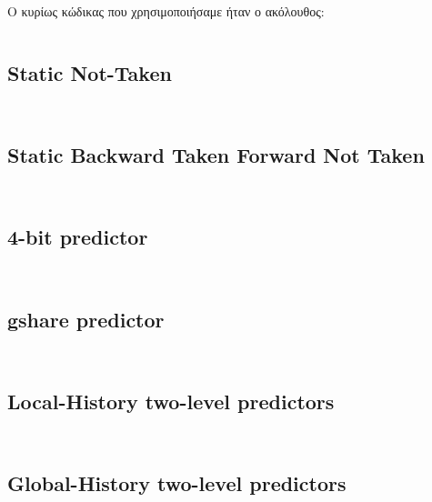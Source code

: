 \documentclass[a4paper,12pt]{article}
\begin{document}
Ο κυρίως κώδικας που χρησιμοποιήσαμε ήταν ο ακόλουθος:
\inputminted[linenos,fontsize=\scriptsize,frame=leftline]{cpp}{files/src-C1-predict.cpp}

\subsection*{Static Not-Taken}
\inputminted[linenos,fontsize=\scriptsize,frame=leftline]{cpp}{files/src-C1-nt_predictor.h}
\inputminted[linenos,fontsize=\scriptsize,frame=leftline]{cpp}{files/src-C1-nt_predictor.cpp}

\subsection*{Static Backward Taken Forward Not Taken}
\inputminted[linenos,fontsize=\scriptsize,frame=leftline]{cpp}{files/src-C1-btfnt_predictor.h}
\inputminted[linenos,fontsize=\scriptsize,frame=leftline]{cpp}{files/src-C1-btfnt_predictor.cpp}

\subsection*{4-bit predictor}
\inputminted[linenos,fontsize=\scriptsize,frame=leftline]{cpp}{files/src-C1-nbit_predictor.h}
\inputminted[linenos,fontsize=\scriptsize,frame=leftline]{cpp}{files/src-C1-nbit_predictor.cpp}

\subsection*{gshare predictor}
\inputminted[linenos,fontsize=\scriptsize,frame=leftline]{cpp}{files/src-C1-gshare_predictor.h}
\inputminted[linenos,fontsize=\scriptsize,frame=leftline]{cpp}{files/src-C1-gshare_predictor.cpp}

\subsection*{Local-History two-level predictors}
\inputminted[linenos,fontsize=\scriptsize,frame=leftline]{cpp}{files/src-C1-localhistory_predictor.h}
\inputminted[linenos,fontsize=\scriptsize,frame=leftline]{cpp}{files/src-C1-localhistory_predictor.cpp}

\subsection*{Global-History two-level predictors}
\inputminted[linenos,fontsize=\scriptsize,frame=leftline]{cpp}{files/src-C1-globalhistory_predictor.h}
\inputminted[linenos,fontsize=\scriptsize,frame=leftline]{cpp}{files/src-C1-globalhistory_predictor.cpp}
\end{document}

